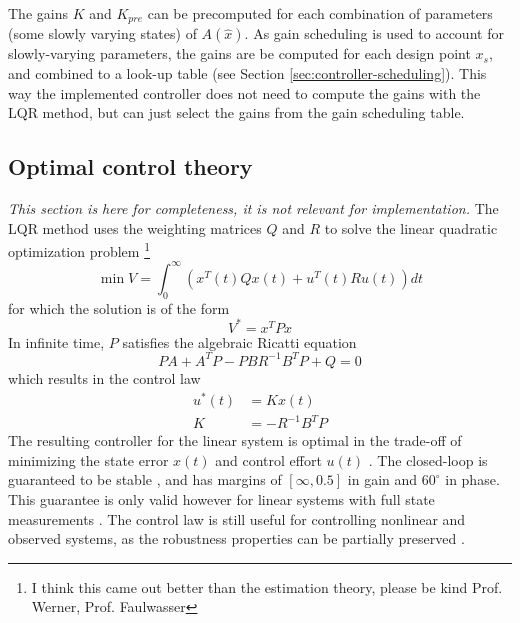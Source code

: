 The gains $K$ and $K_{pre}$ can be precomputed for each combination of parameters (some slowly varying states) of $A(\hat x)$.
As gain scheduling is used to account for slowly-varying parameters, the gains are be computed for each design point $x_s$, and combined to a look-up table (see Section \ref{sec:controller-scheduling}).
This way the implemented controller does not need to compute the gains with the LQR method, but can just select the gains from the gain scheduling table. 

\subsection{Optimal control theory}
\label{sec:controller-theory}
\textit{This section is here for completeness, it is not relevant for implementation.}
The LQR method uses the weighting matrices $Q$ and $R$ to solve the linear quadratic optimization problem \cite{werner2021b} \footnote{I think this came out better than the estimation theory, please be kind Prof. Werner, Prof. Faulwasser}
\begin{equation}
    \min V = \int_0^{\infty} (x^T(t) Q x(t) + u^T(t) R u(t)) dt
\end{equation}
for which the solution is of the form 
\begin{equation}
    V^* = x^T P x
\end{equation}
In infinite time, $P$ satisfies the algebraic Ricatti equation 
\begin{equation}
    PA + A^TP - PBR^{-1}B^TP + Q = 0
\end{equation}
which results in the control law
\begin{align}
    u^*(t) &= K x(t) \\
    K &= -R^{-1}B^TP
\end{align}
The resulting controller for the linear system is optimal in the trade-off of minimizing the state error $x(t)$ and control effort $u(t)$ \cite{werner2021}.
The closed-loop is guaranteed to be stable \cite{werner2021b}, and has margins of $[\infty, 0.5]$ in gain and $60^\circ$ in phase. 
This guarantee is only valid however for linear systems with full state measurements \cite{doyle1978}.
The control law is still useful for controlling nonlinear and observed systems, as the robustness properties can be partially preserved \cite{werner2021b}.


